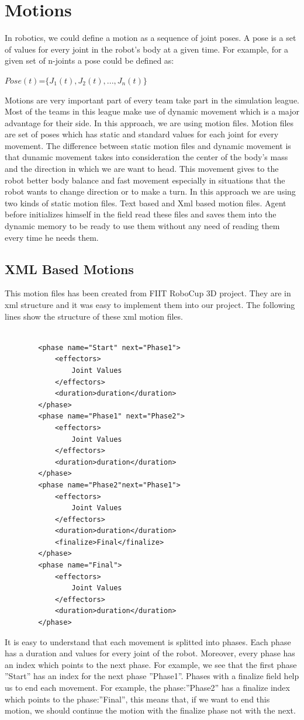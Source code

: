 \section{Motions}
In robotics, we could define a motion as a sequence of joint poses. A pose is a set of values for every joint in the robot's body at a given time.
For example, for a given set of n-joints a pose could be defined as:\\
\begin{center}
$Pose(t)$=$\lbrace J_{1}(t),J_{2}(t),...,J_{n}(t) \rbrace$\\
\end{center}
Motions are very important part of every team take part in the simulation league. Most of the teams in this league make use of dynamic movement which is a major advantage for their side. In this approach, we are using motion files. Motion files are set of poses which has static and standard values for each joint for every movement. The difference between static motion files and dynamic movement is that dunamic movement takes into consideration the center of the body's mass and the direction in which we are want to head. This movement gives to the robot better body balance and fast movement especially in situations that the robot wants to change direction or to make a turn. In this approach we are using two kinds of static motion files. Text based and Xml based motion files. Agent before initializes himself in the field read these files and saves them into the dynamic memory to be ready to use them without any need of reading them every time he needs them.



\subsection{XML Based Motions}
This motion files has been created from FIIT RoboCup 3D project. They are in xml structure and it was easy to implement them into our project. The following lines show the structure of these xml motion files.
\begin{verbatim}

		<phase name="Start" next="Phase1">
			<effectors>
				Joint Values
			</effectors>
			<duration>duration</duration>
		</phase>
		<phase name="Phase1" next="Phase2">
			<effectors>
				Joint Values
			</effectors>
			<duration>duration</duration>
		</phase>
		<phase name="Phase2"next="Phase1">
			<effectors>
				Joint Values
			</effectors>
			<duration>duration</duration>
			<finalize>Final</finalize>
		</phase>
		<phase name="Final">
			<effectors>
				Joint Values
			</effectors>
			<duration>duration</duration>
		</phase>

\end{verbatim}
It is easy to understand that each movement is splitted into phases. Each phase has a duration and values for every joint of the robot. Moreover,
every phase has an index which points to the next phase. For example, we see that the first phase ''Start'' has an index for the next phase ''Phase1''. Phases with a finalize field help us to end each movement. For example, the phase:''Phase2'' has a finalize index which points to the phase:''Final'', this means that, if we want to end this motion, we should continue the motion with the finalize phase not with the next.
